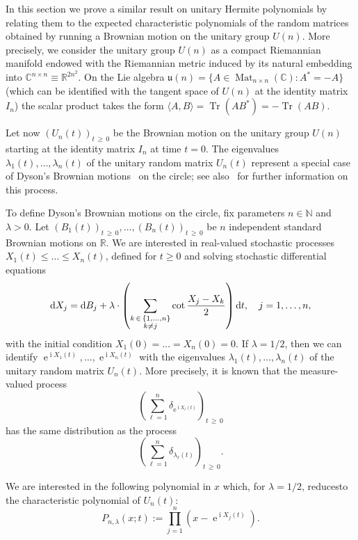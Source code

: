 \documentclass[10pt]{amsart}
\theoremstyle{definition}\newtheorem{defi}[theo]{Definition}\newtheorem{rema}[theo]{Remark}\newtheorem{exam}[theo]{Example}\newtheorem{exem}[theo]{Example}\newtheorem{nota}[theo]{Notation}
\DeclareMathOperator*{\Tr}{Tr}
\DeclareMathOperator{\Mat}{Mat}
\DeclareMathOperator{\eee}{e}
\DeclareMathOperator{\ii}{i}
\newcommand{\fku}{\mathfrak{u}}
\newcommand{\R}{\mathbb{R}}
\newcommand{\N}{\mathbb{N}}
\newcommand{\C}{\mathbb{C}}
\newcommand*\dint{\text{\normalfont d}}
\begin{document}
In this section we prove a similar result on unitary Hermite polynomials by relating them to the expected characteristic polynomials of the random matrices obtained by running a Brownian motion on the unitary group $U(n)$. More precisely, we consider the unitary group $U(n)$ as a compact Riemannian manifold endowed with the Riemannian metric induced by its natural embedding into $\C^{n\times n}\equiv \R^{2n^2}$. On the Lie algebra $\fku(n)= \{A\in \Mat_{n\times n}(\C): A^* = -A\}$ (which can be identified with the tangent space of $U(n)$ at the identity matrix $I_n$) the scalar product takes the form $\langle A, B\rangle = \Tr (A B^*) = - \Tr (AB)$.

Let now $(U_n(t))_{t\,\geq\,0}$ be the Brownian motion on the unitary group $U(n)$ starting at the identity matrix $I_n$ at time $t=0$. The eigenvalues $\lambda_1(t), \ldots, \lambda_n(t)$ of the unitary random matrix $U_n(t)$ represent a special case of Dyson's Brownian motions~\cite[Section~III]{dyson} on the circle; see also~\cite{
biane_matrixvalued,buijsman,
cepa_lepingle_circle,
forrester2024dip,hall_notes,hobson_werner} for further information on this process.


To define Dyson's Brownian motions on the circle, fix parameters $n\in \N$ and $\lambda>0$. Let $(B_1(t))_{t\,\geq\,0},\ldots,(B_n(t))_{t\,\geq\,0}$ be $n$ independent standard Brownian motions on $\R$. We are interested in real-valued stochastic processes $X_1(t) \leq \ldots \leq X_n(t)$, defined for $t\geq 0$ and solving stochastic differential equations
\begin{equation}\label{eq:diffusions_singular_drifts}
\dint X_j = \dint B_j + \lambda \cdot \left(\sum_{\substack{k\,\in\,\{1,\ldots,n\}\\ k\neq j}} \cot \frac{X_j -X_k}{2}\right) \dint t,
\quad j=1,\ldots, n,
\end{equation}
with the initial condition $X_1(0)= \ldots = X_n(0) = 0$. If $\lambda=1/2$, then we can identify $\eee^{\ii X_1(t)},\ldots, \eee^{\ii X_n(t)}$ with the eigenvalues $\lambda_1(t), \ldots, \lambda_n(t)$ of the unitary random matrix $U_n(t)$. More precisely, it is known that the measure-valued process
\[
\left(\sum_{\ell=1}^n \delta_{\eee^{\ii X_\ell(t)}}\right)_{t\,\geq\,0}
\]
has the same distribution as the process
\[
\left(\sum_{\ell=1}^n \delta_{\lambda_\ell(t)}\right)_{t\,\geq\,0}.
\]

We are interested in the following polynomial in $x$ which, for $\lambda=1/2$, reduces\linebreak to the characteristic polynomial of $U_n(t)$:
\[
P_{n,\lambda}(x; t) := \prod_{j=1}^n \left(x- \eee^{\ii X_j(t)}\right).
\]
\end{document}
